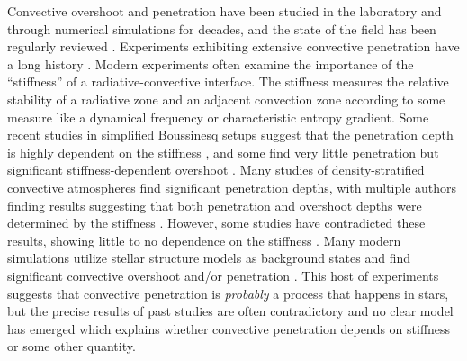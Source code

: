 \documentclass[twocolumn]{aastex631}
\begin{document}
Convective overshoot and penetration have been studied in the laboratory and through numerical simulations for decades, and the state of the field has been regularly reviewed \citep[e.g.,][]{marcus_etal_1983, zahn1991, browning_etal_2004, rogers_etal_2006, viallet_etal_2015, korre_etal_2019}.
Experiments exhibiting extensive convective penetration have a long history \citep[dating back to e.g.,][]{musman1968, deardorff_etal_1969, moore_weiss_1973}.
Modern experiments often examine the importance of the ``stiffness'' of a radiative-convective interface.
The stiffness measures the relative stability of a radiative zone and an adjacent convection zone according to some measure like a dynamical frequency or characteristic entropy gradient.
Some recent studies in simplified Boussinesq setups suggest that the penetration depth is highly dependent on the stiffness \citep{couston_etal_2017, toppaladoddi_wettlaufer_2018}, and some find very little penetration but significant stiffness-dependent overshoot \citep{korre_etal_2019}.
Many studies of density-stratified convective atmospheres find significant penetration depths, with multiple authors finding results suggesting that both penetration and overshoot depths were determined by the stiffness \citep{hurlburt_etal_1986, hurlburt_etal_1994, singh_etal_1995, saikia_etal_2000, browning_etal_2004, dietrich_wicht_2018}.
However, some studies have contradicted these results, showing little to no dependence on the stiffness \citep{brummell_etal_2002, rogers_glatzmaier_2005}.
Many modern simulations utilize stellar structure models as background states and find significant convective overshoot and/or penetration \citep{browning_etal_2004, rogers_etal_2006, kitiashvili_etal_2016, brun_etal_2017, pratt_etal_2017, higl_etal_2021}.
This host of experiments suggests that convective penetration is \emph{probably} a process that happens in stars, but the precise results of past studies are often contradictory and no clear model has emerged which explains whether convective penetration depends on stiffness or some other quantity.
\end{document}
